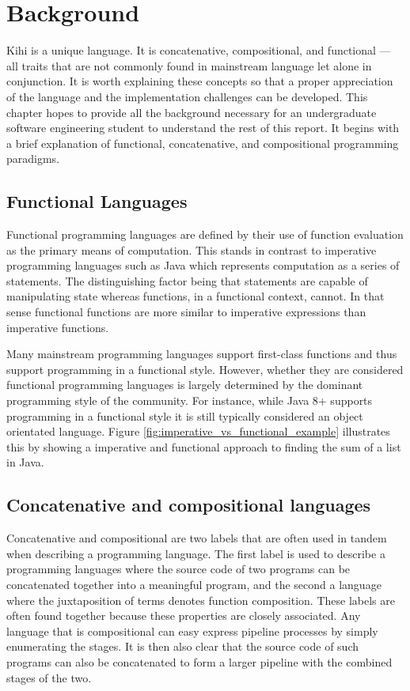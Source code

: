 \chapter{Background} \label{C:background} 
Kihi is a unique language. It is concatenative, compositional, and functional --- all traits that are not commonly found in mainstream language let alone in conjunction. It is worth explaining these concepts so that a proper appreciation of the language and the implementation challenges can be developed. 
This chapter hopes to provide all the background
necessary for an undergraduate software engineering student
to understand the rest of this report.
It begins with a brief explanation of 
functional, concatenative, and compositional
programming paradigms.

\section{Functional Languages}
Functional programming languages are defined by their use
of function evaluation as the primary means of computation.
This stands in contrast to imperative programming languages
such as Java which represents computation as a series of 
statements. The distinguishing factor being that statements
are capable of manipulating state whereas functions,
in a functional context, cannot.
In that sense functional functions are more similar to imperative
expressions than imperative functions.

Many mainstream programming languages support first-class functions and thus support programming in a functional style. However, whether they are considered functional programming languages is largely determined by the dominant programming style of the community. For instance, while Java 8+ supports programming in a functional style it is still typically considered an object orientated language. Figure
\ref{fig:imperative_vs_functional_example} illustrates this by showing a imperative and functional approach to finding the sum
of a list in Java.





\section{Concatenative and compositional languages}
Concatenative and compositional are two labels that are often used in tandem when describing a programming language. The first label is used to describe a programming languages where the source code of two programs can be concatenated together into a meaningful program, and the second a language where the juxtaposition of terms denotes function composition. These labels are often found together because these properties are closely associated. Any language that is compositional can easy express pipeline processes by simply enumerating the stages. It is then also clear that the source code of such programs can also be concatenated to form a larger pipeline with the combined stages of the two.

